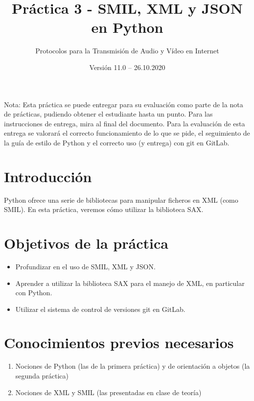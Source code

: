 \documentclass[11pt,a4paper]{article}
\begin{document}
\title{Práctica 3 - SMIL, XML y JSON en Python}
\author{Protocolos para la Transmisión de Audio y Vídeo en Internet}
\date{Versión 11.0 – 26.10.2020}


\maketitle


Nota: Esta práctica se puede entregar para su evaluación como parte de la nota de prácticas, pudiendo obtener el estudiante hasta un punto. Para las instrucciones de entrega, mira al final del documento. Para la evaluación de esta entrega se valorará el correcto funcionamiento de lo que se pide, el seguimiento de la guía de estilo de Python y el correcto uso (y entrega) con git en GitLab.

\section{Introducción}

Python ofrece una serie de bibliotecas para manipular ficheros en XML (como SMIL). En esta práctica, veremos cómo utilizar la biblioteca SAX.

\section{Objetivos de la práctica}

\begin{itemize}
  \item Profundizar en el uso de SMIL, XML y JSON.
  \item Aprender a utilizar la biblioteca SAX para el manejo de XML, en particular con Python.
  \item Utilizar el sistema de control de versiones git en GitLab.
\end{itemize}

\section{Conocimientos previos necesarios}

\begin{enumerate}
  \item Nociones de Python (las de la primera práctica) y de orientación a objetos (la segunda práctica)
  \item Nociones de XML y SMIL (las presentadas en clase de teoría)
\end{enumerate}
\end{document}
